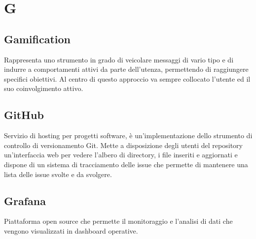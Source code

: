 \section*{G}

\subsection{Gamification}
Rappresenta uno strumento in grado di veicolare messaggi di vario tipo e di indurre a comportamenti attivi da parte dell’utenza, permettendo di raggiungere specifici obiettivi. Al centro di questo approccio va sempre collocato l'utente ed il suo coinvolgimento attivo.

\subsection{GitHub}
Servizio di hosting per progetti software, è un'implementazione dello strumento di controllo di versionamento Git. Mette a disposizione degli utenti del repository un'interfaccia web per vedere l'albero di directory, i file inseriti e aggiornati e dispone di un sistema di tracciamento delle issue che permette di mantenere una lista delle issue svolte e da svolgere.


\subsection{Grafana}
Piattaforma open source che permette il monitoraggio e l'analisi di dati che vengono visualizzati in dashboard operative. 